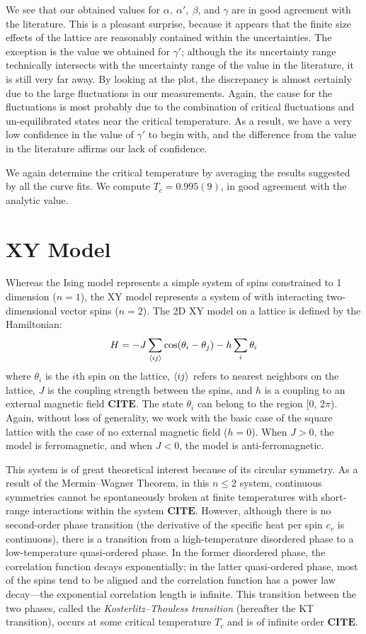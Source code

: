 \documentclass[twocolumn,aps,prl]{revtex4-1} %
\begin{document}
We see that our obtained values for $\alpha,\ \alpha',\ \beta$, and $\gamma$ are in good agreement with the literature. This is a pleasant surprise, because it appears that the finite size effects of the lattice are reasonably contained within the uncertainties. The exception is the value we obtained for $\gamma'$; although the its uncertainty range technically intersects with the uncertainty range of the value in the literature, it is still very far away. By looking at the plot, the discrepancy is almost certainly due to the large fluctuations in our measurements. Again, the cause for the fluctuations is most probably due to the combination of critical fluctuations and un-equilibrated states near the critical temperature. As a result, we have a very low confidence in the value of $\gamma'$ to begin with, and the difference from the value in the literature affirms our lack of confidence.

We again determine the critical temperature by averaging the results suggested by all the curve fits. We compute $T_c = 0.995(9)$, in good agreement with the analytic value.



\section{XY Model}
Whereas the Ising model represents a simple system of spins constrained to 1 dimension ($n=1$), the XY model represents a system of with interacting two-dimensional vector spins ($n=2$). The 2D XY model on a lattice is defined by the Hamiltonian: 
\begin{equation}
H = -J\sum_{\braket{ij}} \cos(\theta_i - \theta_j) - h\sum_i \theta_i
\end{equation}
where $\theta_i$ is the $i$th spin on the lattice, $\braket{ij}$ refers to nearest neighbors on the lattice, $J$ is the coupling strength between the spins, and $h$ is a coupling to an external magnetic field $\textbf{CITE}$. The state $\theta_i$ can belong to the region [0, 2$\pi$). Again, without loss of generality, we work with the basic case of the square lattice with the case of no external magnetic field ($h=0$). When $J > 0$, the model is ferromagnetic, and when $J<0$, the model is anti-ferromagnetic. 

This system is of great theoretical interest because of its circular symmetry. As a result of the Mermin--Wagner Theorem, in this $n \leq 2$ system, continuous symmetries cannot be spontaneously broken at finite temperatures with short-range interactions within the system $\textbf{CITE}$. However, although there is no second-order phase transition (the derivative of the specific heat per spin $c_v$ is continuous), there is a transition from a high-temperature disordered phase to a low-temperature quasi-ordered phase. In the former disordered phase, the correlation function decays exponentially; in the latter quasi-ordered phase, most of the spins tend to be aligned and the correlation function has a power law decay---the exponential correlation length is infinite. This transition between the two phases, called the \textit{Kosterlitz--Thouless transition} (hereafter the KT transition), occurs at some critical temperature $T_c$ and is of infinite order $\textbf{CITE}$. 
\end{document}
